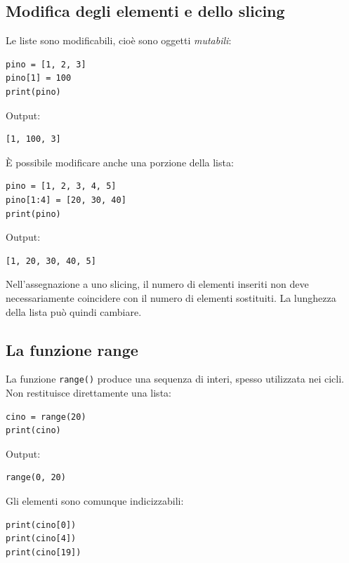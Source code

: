\documentclass[11pt,a4paper]{book}
\begin{document}
\subsection{Modifica degli elementi e dello slicing}

Le liste sono modificabili, cioè sono oggetti \emph{mutabili}:

\begin{lstlisting}[style=python]
pino = [1, 2, 3]
pino[1] = 100
print(pino)
\end{lstlisting}

Output:

\begin{lstlisting}[style=python, numbers=none]
[1, 100, 3]
\end{lstlisting}

È possibile modificare anche una porzione della lista:

\begin{lstlisting}[style=python]
pino = [1, 2, 3, 4, 5]
pino[1:4] = [20, 30, 40]
print(pino)
\end{lstlisting}

Output:

\begin{lstlisting}[style=python, numbers=none]
[1, 20, 30, 40, 5]
\end{lstlisting}

Nell'assegnazione a uno slicing, il numero di elementi inseriti non deve necessariamente coincidere con il numero di elementi sostituiti. La lunghezza della lista può quindi cambiare.

\subsection{La funzione range}

La funzione \texttt{range()} produce una sequenza di interi, spesso utilizzata nei cicli. Non restituisce direttamente una lista:

\begin{lstlisting}[style=python]
cino = range(20)
print(cino)
\end{lstlisting}

Output:

\begin{lstlisting}[style=python, numbers=none]
range(0, 20)
\end{lstlisting}

Gli elementi sono comunque indicizzabili:

\begin{lstlisting}[style=python]
print(cino[0])
print(cino[4])
print(cino[19])
\end{lstlisting}
\end{document}
